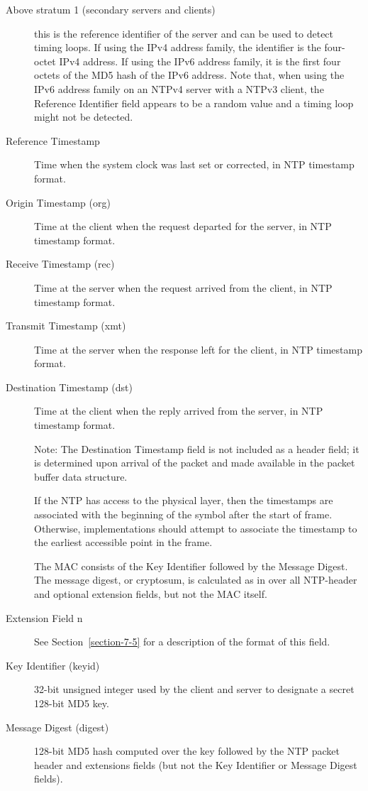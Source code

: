 \begin{description}
  \item[Above stratum 1 (secondary servers and clients)] this is the
    reference identifier of the server and can be used to detect timing
    loops. If using the IPv4 address family, the identifier is the four-
    octet IPv4 address. If using the IPv6 address family, it is the
    first four octets of the MD5 hash of the IPv6 address. Note that,
    when using the IPv6 address family on an NTPv4 server with a NTPv3
    client, the Reference Identifier field appears to be a random value
    and a timing loop might not be detected.

  \item[Reference Timestamp] Time when the system clock was last set or
    corrected, in NTP timestamp format.

  \item[Origin Timestamp (org)] Time at the client when the request departed
    for the server, in NTP timestamp format.

  \item[Receive Timestamp (rec)] Time at the server when the request arrived
    from the client, in NTP timestamp format.

  \item[Transmit Timestamp (xmt)] Time at the server when the response left
    for the client, in NTP timestamp format.

  \item[Destination Timestamp (dst)] Time at the client when the reply
    arrived from the server, in NTP timestamp format.

    Note: The Destination Timestamp field is not included as a header
    field; it is determined upon arrival of the packet and made available
    in the packet buffer data structure.

    If the NTP has access to the physical layer, then the timestamps are
    associated with the beginning of the symbol after the start of frame.
    Otherwise, implementations should attempt to associate the timestamp
    to the earliest accessible point in the frame.

    The MAC consists of the Key Identifier followed by the Message
    Digest. The message digest, or cryptosum, is calculated as in
    \cite{RFC1321} over all NTP-header and optional extension fields, but not
    the MAC itself.

  \item[Extension Field n] See Section~\ref{section-7-5} for a description of the format of
    this field.

  \item[Key Identifier (keyid)] 32-bit unsigned integer used by the client
    and server to designate a secret 128-bit MD5 key.

  \item[Message Digest (digest)] 128-bit MD5 hash computed over the key
    followed by the NTP packet header and extensions fields (but not the
    Key Identifier or Message Digest fields).

\end{description}

